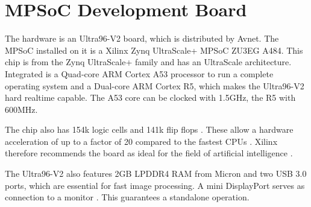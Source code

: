 \section{MPSoC Development Board}
\label{sec:board}
The hardware is an Ultra96-V2 board, which is distributed by Avnet.
The MPSoC installed on it is a Xilinx Zynq UltraScale+ MPSoC ZU3EG A484.
This chip is from the Zynq UltraScale+ family and has an UltraScale architecture.
Integrated is a Quad-core ARM Cortex A53 processor to run a complete operating system and a Dual-core ARM Cortex R5, which makes the Ultra96-V2 hard realtime capable.
The A53 core can be clocked with 1.5GHz, the R5 with 600MHz.

The chip also has 154k logic cells and 141k flip flops \cite{XilinxZynq}.
These allow a hardware acceleration of up to a factor of 20 compared to the fastest CPUs \cite{AccelerationXilinx}.
Xilinx therefore recommends the board as ideal for the field of artificial intelligence \cite{AIResourcesXilinx}.

The Ultra96-V2 also features 2GB LPDDR4 RAM from Micron and two USB 3.0 ports, which are essential for fast image processing.
A mini DisplayPort serves as connection to a monitor \cite{AvnetUltra96v2}. This guarantees a standalone operation.

